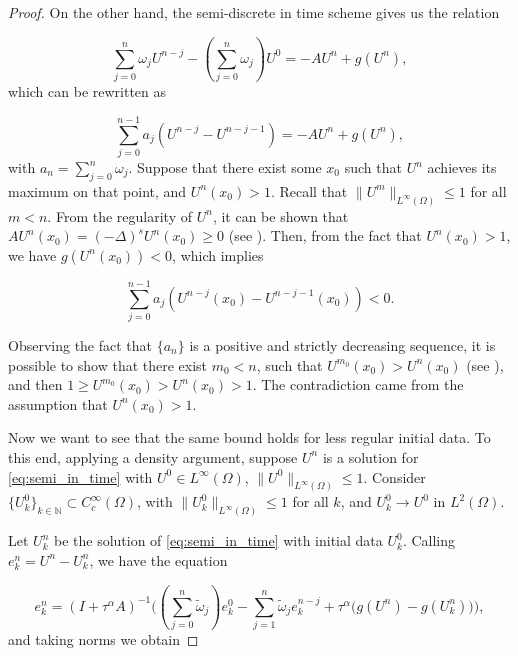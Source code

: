 \documentclass{amsart}
\newcommand{\ele}{L^2(\Omega)}
\newcommand{\w}{\omega}
\newcommand{\W}{\Omega}
\newcommand{\wtilde}{\tilde{\w}}
\newcommand{\fmonio}{g}
\def\N{{\mathbb {N}}}
\theoremstyle{remark}
\theoremstyle{definition}
\numberwithin{equation}{section}
\begin{document}
\begin{proof}
On the other hand, the semi-discrete in time scheme gives us the relation           
	
\begin{equation*}
\label{eq:semi_time_ex3}
        \sum^n_{j=0}\w_j U^{n-j} - \left(\sum_{j=0}^{n}\w_j \right)U^{0}  = -  A U^n +  \fmonio(U^n), 
\end{equation*}
which can be rewritten as 

\begin{equation*}
\label{eq:semi_time_ex4}
        \sum^{n-1}_{j=0}a_j (U^{n-j}-U^{n-j-1})   = - A U^n +  \fmonio(U^n), 
\end{equation*}
with $a_n = \sum^{n}_{j=0} \w_j$.  
Suppose that there exist some $x_0$ such that $U^n$ achieves its maximum on that point, and $U^n(x_0)>1$. Recall that $\|U^m\|_{L^{\infty}(\W)} \leq 1$ for all $m<n$. From the regularity of $U^n$, it can be shown that $A U^n(x_0) = (-\Delta)^s U^n(x_0) \geq 0$ (see \cite[Lemma 3.9]{FR}). Then, from the fact that $U^n(x_0)>1$, we have $\fmonio(U^n(x_0))<0$, which implies

\begin{equation*}
\label{eq:semi_time_ex5}
        \sum^{n-1}_{j=0}a_j (U^{n-j}(x_0)-U^{n-j-1}(x_0))   < 0.
\end{equation*}

Observing the fact that $\{a_n\}$ is a positive and strictly decreasing sequence, it is possible to show that there exist $m_0<n$, such that $U^{m_0}(x_0) > U^{n}(x_0)$ (see \cite[Lemma 5.2.4]{tesis_yo}), and then $1 \geq U^{m_0}(x_0) > U^{n}(x_0) > 1$. The contradiction came from the assumption that $U^{n}(x_0) > 1$.

Now we want to see that the same bound holds for less regular initial data. To this end, applying a density argument, suppose $U^n$ is a solution for \eqref{eq:semi_in_time} with  $U^0 \in L^{\infty}(\W)$, $\|U^0\|_{L^{\infty}(\W)}\leq 1$. Consider $\{U^0_k\}_{k \in \N} \subset C^{\infty}_c(\W)$, with $\|U^0_k\|_{L^{\infty}(\W)}\leq 1$ for all $k$, and $ U^0_k \to U^0 $ in $\ele$. 

Let $U^n_k$ be the solution of \eqref{eq:semi_in_time} with initial data $U^0_k$. Calling $e^n_k = U^n - U^n_k$, we have the equation

\begin{equation*} 
      e^n_k  =  ( I  +  \tau^{\alpha}  A)^{-1} \Big( \left(\sum_{j=0}^{n}\wtilde_j \right)e^{0}_k -  \sum^n_{j=1}\wtilde_j e^{n-j}_k +  \tau^{\alpha} \big( \fmonio(U^n) - \fmonio(U^n_k) \big) \Big),
\label{eq:semi_time_ex6}
\end{equation*}
 and taking norms we obtain 


\end{proof}
\end{document}
